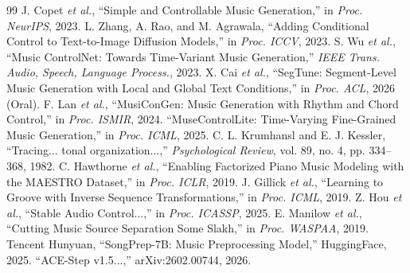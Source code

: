 \documentclass[11pt,twocolumn]{article}
\begin{document}
\begin{thebibliography}{99}
 J. Copet \textit{et al.}, ``Simple and Controllable Music Generation,'' in \textit{Proc. NeurIPS}, 2023.
 L. Zhang, A. Rao, and M. Agrawala, ``Adding Conditional Control to Text-to-Image Diffusion Models,'' in \textit{Proc. ICCV}, 2023.
 S. Wu \textit{et al.}, ``Music ControlNet: Towards Time-Variant Music Generation,'' \textit{IEEE Trans. Audio, Speech, Language Process.}, 2023.
 X. Cai \textit{et al.}, ``SegTune: Segment-Level Music Generation with Local and Global Text Conditions,'' in \textit{Proc. ACL}, 2026 (Oral).
 F. Lan \textit{et al.}, ``MusiConGen: Music Generation with Rhythm and Chord Control,'' in \textit{Proc. ISMIR}, 2024.
 ``MuseControlLite: Time-Varying Fine-Grained Music Generation,'' in \textit{Proc. ICML}, 2025.
 C. L. Krumhansl and E. J. Kessler, ``Tracing... tonal organization...,'' \textit{Psychological Review}, vol. 89, no. 4, pp. 334--368, 1982.
 C. Hawthorne \textit{et al.}, ``Enabling Factorized Piano Music Modeling with the MAESTRO Dataset,'' in \textit{Proc. ICLR}, 2019.
 J. Gillick \textit{et al.}, ``Learning to Groove with Inverse Sequence Transformations,'' in \textit{Proc. ICML}, 2019.
 Z. Hou \textit{et al.}, ``Stable Audio Control...,'' in \textit{Proc. ICASSP}, 2025.
 E. Manilow \textit{et al.}, ``Cutting Music Source Separation Some Slakh,'' in \textit{Proc. WASPAA}, 2019.
 Tencent Hunyuan, ``SongPrep-7B: Music Preprocessing Model,'' HuggingFace, 2025.
 ``ACE-Step v1.5...,'' arXiv:2602.00744, 2026.
\end{thebibliography}
\end{document}
